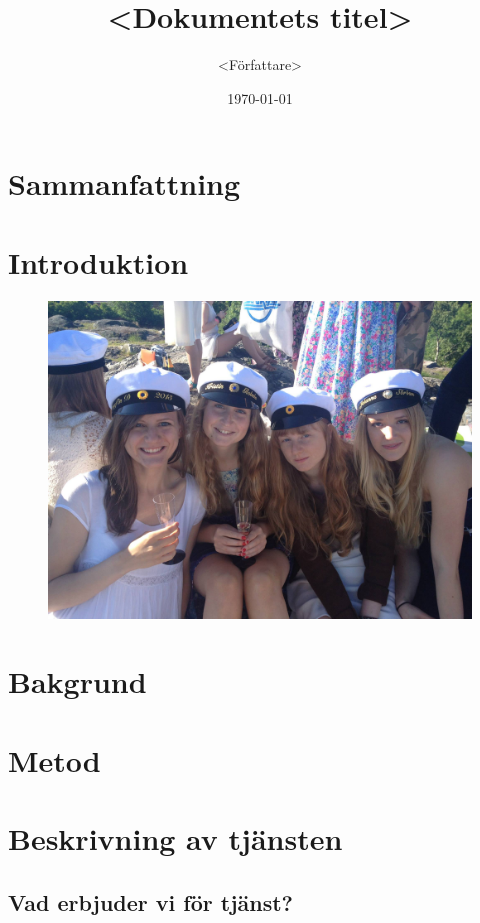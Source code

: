 \documentclass[10pt,a4paper,oneside]{article}
\title{<Dokumentets titel>}
\author{<Författare>}
\date{\today}
\begin{document}
\maketitle
\newpage

\section{Sammanfattning}
\cite{test1}
\newpage

\tableofcontents
\newpage

\section{Introduktion}

\begin{figure}[H]
\includegraphics[scale=0.1]{pic.png}
\end{figure}

\newpage

\section{Bakgrund}
\newpage

\section{Metod}
\newpage

\section{Beskrivning av tjänsten}
\subsection{Vad erbjuder vi för tjänst?}
\end{document}
